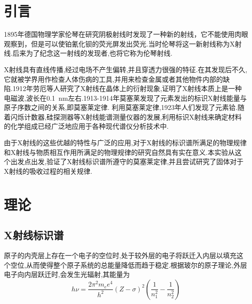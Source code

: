 \documentclass[a4paper]{article}
\begin{document}
\begin{center}
\tableofcontents\label{c}
\end{center}
\newpage

\section{引言} \label{overview}%
1895年德国物理学家伦琴在研究阴极射线时发现了一种新的射线，它不能使用肉眼观察到，但是可以使铂氰化钡的荧光屏发出荧光.当时伦琴将这一新射线称为X射线.后来为了纪念这一射线的发现者,也将它称为伦琴射线.

X射线具有直线传播,经过电场不产生偏转,并且穿透力很强的特征.在其发现后不久,它就被学界用作检查人体伤病的工具,并用来检查金属或者其他物件内部的缺陷.1912年劳厄等人研究了X射线在晶体上的衍射现象,证明了X射线本质上是一种电磁波,波长在\SI{0.1}{nm}左右.1913-1914年莫塞莱发现了元素发出的标识X射线能量与原子序数之间的关系,即莫塞莱定律.
利用莫塞莱定律,1923年人们发现了元素铪.随着闪烁计数器,硅探测器等X射线能谱测量仪器的发展,利用标识X射线来确定材料的化学组成已经广泛地应用于各种现代谱仪分析技术中.

由于X射线的这些优越的特性与广泛的应用,对于X射线的标识谱所满足的物理规律和X射线与物质相互作用所满足的物理规律的研究自然具有实在意义.本实验从这个出发点出发,验证了X射线标识谱所遵守的莫塞莱定律,并且尝试研究了固体对于X射线的吸收过程的相关规律.


\newpage
\section{理论} \label{theory}%
\subsection{X射线标识谱}

原子的内壳层上存在一个电子的空位时,处于较外层的电子将跃迁入内层以填充这个空位,从而使得整个原子系统的总能量降低而趋于稳定.根据玻尔的原子理论,外层电子向内层跃迁时,会发生光辐射,其能量为
\begin{equation}
    \label{eq:Eofphoton}
    h\nu = \frac{2\pi^2m_ee^4}{h^2}(Z - \sigma)^2(\frac{1}{n_1^2} -
    \frac{1}{n_2^2})
\end{equation}
\end{document}

